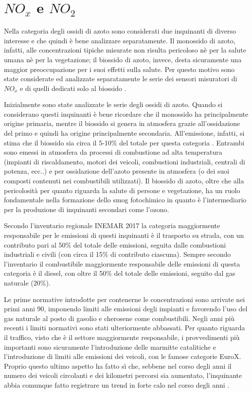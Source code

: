 \documentclass[a4paper]{report}
\begin{document}
\section{$NO_x$ e $NO_2$}
Nella categoria degli ossidi di azoto sono considerati due inquinanti di diverso interesse e che quindi è bene analizzare separatamente. Il monossido di azoto, infatti, alle concentrazioni tipiche misurate non risulta pericoloso nè per la salute umana nè per la vegetazione; il biossido di azoto, invece, desta sicuramente una maggior preoccupazione per i suoi effetti sulla salute. Per questo motivo sono state considerate ed analizzate separatamente le serie dei sensori misuratori di $NO_x$ e di quelli dedicati solo al biossido \cite{world2006air}.

Inizialmente sono state analizzate le serie degli ossidi di azoto. Quando si considerano questi inquinanti è bene ricordare che il monossido ha principalmente origine primaria, mentre il biossido si genera in atmosfera grazie all'ossidazione del primo e quindi ha origine principalmente secondaria. All'emissione, infatti, si stima che il biossido sia circa il 5-10\% del totale per questa categoria \cite{arpa2018rapporto}.  
Entrambi sono emessi in atmosfera da processi di combustione ad alta temperatura (impianti di riscaldamento, motori dei veicoli, combustioni industriali, centrali di potenza, ecc..) e per ossidazione dell'azoto presente in atmosfera (o dei suoi composti contenuti nei combustibili utilizzati). Il biossido di azoto, oltre che alla pericolosità per quanto riguarda la salute di persone e vegetazione, ha un ruolo fondamentale nella formazione dello smog fotochimico in quanto è l'intermediario per la produzione di inquinanti secondari come l'ozono.

Secondo l'inventario regionale INEMAR 2017 \cite{inemar2017} la categoria maggiormente responsabile per le emissioni di questi inquinanti è il trasporto su strada, con un contributo pari al 50\% del totale delle emissioni, seguita dalle combustioni industriali e civili (con circa il 15\% di contributo ciascuna). Sempre secondo l'inventario il combustibile maggiormente responsabile delle emissioni di questa categoria è il diesel, con oltre il 50\% del totale delle emissioni, seguito dal gas naturale (20\%).

Le prime normative introdotte per contenerne le concentrazioni sono arrivate nei primi anni 90, imponendo limiti alle emissioni degli impianti e favorendo l'uso del gas naturale al posto di gasolio e cherosene come combustibili. Negli anni più recenti i limiti normativi sono stati ulteriormente abbassati. Per quanto riguarda il traffico, visto che è il settore maggiormente responsabile, i provvedimenti più importanti sono sicuramente l'introduzione delle marmitte catalitiche e l'introduzione di limiti alle emissioni dei veicoli, con le famose categorie EuroX. Proprio questo ultimo aspetto ha fatto sì che, sebbene nel corso degli anni il numero dei veicoli circolanti e dei kilometri percorsi sia aumentato, l'inquinante abbia comunque fatto registrare un trend in forte calo nel corso degli anni \cite{iir2020}.
\end{document}
